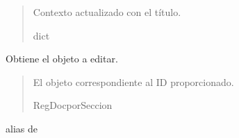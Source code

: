 \documentclass[letterpaper,10pt,spanish]{sphinxmanual}
\begin{document}
\begin{fulllineitems}
\begin{fulllineitems}
\begin{quote}
\begin{description}
\sphinxAtStartPar
Contexto actualizado con el título.

\sphinxAtStartPar
dict

\end{description}\end{quote}

\end{fulllineitems}



\begin{fulllineitems}

\pysigstartsignatures
{}
\pysigstopsignatures
\sphinxAtStartPar
Obtiene el objeto a editar.
\begin{quote}\begin{description}
\sphinxAtStartPar
El objeto correspondiente al ID proporcionado.

\sphinxAtStartPar
RegDocporSeccion

\end{description}\end{quote}

\end{fulllineitems}



\begin{fulllineitems}

\pysigstartsignatures
{}
\pysigstopsignatures
\sphinxAtStartPar
alias de 

\end{fulllineitems}



\begin{fulllineitems}

\pysigstartsignatures
{}
\pysigstopsignatures
\end{fulllineitems}



\begin{fulllineitems}

\pysigstartsignatures
{}
\pysigstopsignatures
\end{fulllineitems}


\end{fulllineitems}
\end{document}

